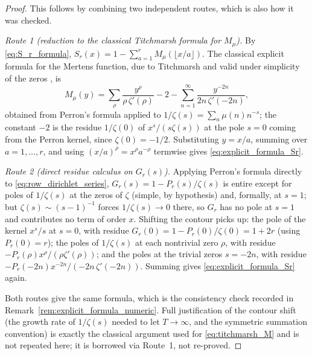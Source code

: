 \documentclass[11pt]{amsart}
\numberwithin{equation}{section}
\theoremstyle{plain}
\theoremstyle{definition}
\theoremstyle{remark}
\newcommand{\mob}{\mu}
\newcommand{\zetaR}{\zeta}
\begin{document}
\begin{proof}
This follows by combining two independent routes, which is also how it was checked.

\emph{Route 1 (reduction to the classical Titchmarsh formula for \(M_\mob\)).}  By \eqref{eq:S_r_formula}, \(S_r(x)=1-\sum_{a=1}^rM_\mob(\lfloor x/a\rfloor)\).  The classical explicit formula for the Mertens function, due to Titchmarsh and valid under simplicity of the zeros \cite{Titchmarsh1986}, is
\begin{equation}
M_\mob(y)=\sum_\rho\frac{y^\rho}{\rho\,\zetaR'(\rho)}-2-\sum_{n=1}^\infty\frac{y^{-2n}}{2n\,\zetaR'(-2n)},
\label{eq:titchmarsh_M}
\end{equation}
obtained from Perron's formula applied to \(1/\zetaR(s)=\sum_n\mob(n)n^{-s}\); the constant \(-2\) is the residue \(1/\zetaR(0)\) of \(x^s/(s\zetaR(s))\) at the pole \(s=0\) coming from the Perron kernel, since \(\zetaR(0)=-1/2\).  Substituting \(y=x/a\), summing over \(a=1,\ldots,r\), and using \((x/a)^\rho=x^\rho a^{-\rho}\) termwise gives \eqref{eq:explicit_formula_Sr}.

\emph{Route 2 (direct residue calculus on \(G_r(s)\)).}  Applying Perron's formula directly to \eqref{eq:row_dirichlet_series}, \(G_r(s)=1-P_r(s)/\zetaR(s)\) is entire except for poles of \(1/\zetaR(s)\) at the zeros of \(\zetaR\) (simple, by hypothesis) and, formally, at \(s=1\); but \(\zetaR(s)\sim(s-1)^{-1}\) forces \(1/\zetaR(s)\to0\) there, so \(G_r\) has no pole at \(s=1\) and contributes no term of order \(x\).  Shifting the contour picks up: the pole of the kernel \(x^s/s\) at \(s=0\), with residue \(G_r(0)=1-P_r(0)/\zetaR(0)=1+2r\) (using \(P_r(0)=r\)); the poles of \(1/\zetaR(s)\) at each nontrivial zero \(\rho\), with residue \(-P_r(\rho)x^\rho/(\rho\zetaR'(\rho))\); and the poles at the trivial zeros \(s=-2n\), with residue \(-P_r(-2n)x^{-2n}/(-2n\,\zetaR'(-2n))\).  Summing gives \eqref{eq:explicit_formula_Sr} again.

Both routes give the same formula, which is the consistency check recorded in Remark~\ref{rem:explicit_formula_numeric}.  Full justification of the contour shift (the growth rate of \(1/\zetaR(s)\) needed to let \(T\to\infty\), and the symmetric summation convention) is exactly the classical argument used for \eqref{eq:titchmarsh_M} and is not repeated here; it is borrowed via Route~1, not re-proved.
\end{proof}
\end{document}
